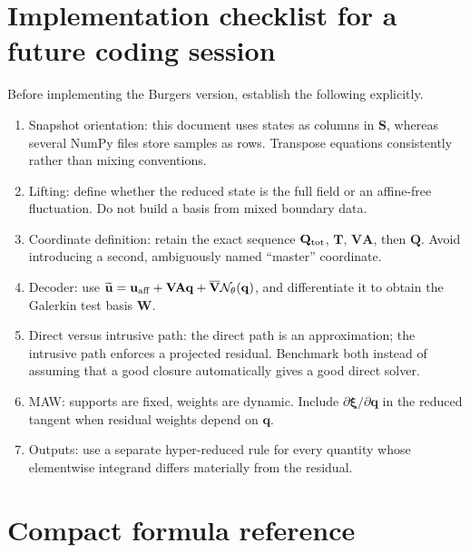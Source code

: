 \documentclass[11pt,a4paper]{article}
\newcommand{\vect}[1]{\mathbf{#1}}
\newcommand{\mat}[1]{\mathbf{#1}}
\begin{document}
\section{Implementation checklist for a future coding session}
\label{sec:checklist}

Before implementing the Burgers version, establish the following explicitly.
\begin{enumerate}[label=\arabic*.,leftmargin=8mm]
  \item Snapshot orientation: this document uses states as columns in
  \(\mat S\), whereas several NumPy files store samples as rows.  Transpose
  equations consistently rather than mixing conventions.
  \item Lifting: define whether the reduced state is the full field or an
  affine-free fluctuation.  Do not build a basis from mixed boundary data.
  \item Coordinate definition: retain the exact sequence
  \(\mat Q_{\rm tot}\), \(\mat T\), \(\mat V\mat A\), then \(\mat Q\).
  Avoid introducing a second, ambiguously named ``master'' coordinate.
  \item Decoder: use
  \(\widetilde{\vect u}=\vect u_{\rm aff}+\mat V\mat A\vect q+
  \overline{\mat V}\mathcal N_\theta(\vect q)\), and differentiate it to
  obtain the Galerkin test basis \(\mat W\).
  \item Direct versus intrusive path: the direct path is an approximation;
  the intrusive path enforces a projected residual.  Benchmark both instead
  of assuming that a good closure automatically gives a good direct solver.
  \item MAW: supports are fixed, weights are dynamic.  Include
  \(\partial\vect\xi/\partial\vect q\) in the reduced tangent when residual
  weights depend on \(\vect q\).
  \item Outputs: use a separate hyper-reduced rule for every quantity whose
  elementwise integrand differs materially from the residual.
\end{enumerate}

\section{Compact formula reference}
\label{sec:formula-reference}
\end{document}
